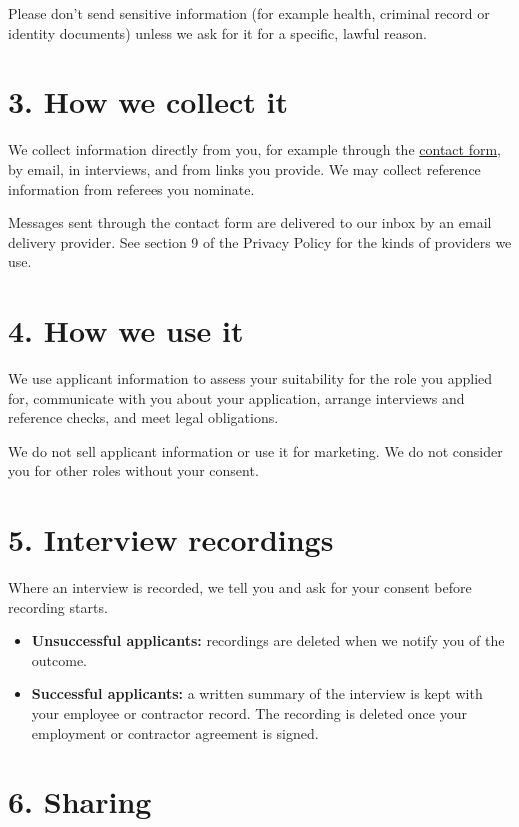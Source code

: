 \documentclass[11pt]{article}
\providecommand{\tightlist}{\setlength{\itemsep}{0pt}\setlength{\parskip}{0pt}}
\begin{document}
Please don't send sensitive information (for example health, criminal record or identity documents) unless we ask for it for a specific, lawful reason.

\section*{3. How we collect it}

We collect information directly from you, for example through the \href{https://repasscloud.com/contact/}{contact form}, by email, in interviews, and from links you provide. We may collect reference information from referees you nominate.

Messages sent through the contact form are delivered to our inbox by an email delivery provider. See section 9 of the Privacy Policy for the kinds of providers we use.

\section*{4. How we use it}

We use applicant information to assess your suitability for the role you applied for, communicate with you about your application, arrange interviews and reference checks, and meet legal obligations.

We do not sell applicant information or use it for marketing. We do not consider you for other roles without your consent.

\section*{5. Interview recordings}

Where an interview is recorded, we tell you and ask for your consent before recording starts.

\begin{itemize}
\tightlist
\item
  \textbf{Unsuccessful applicants:} recordings are deleted when we notify you of the outcome.
\item
  \textbf{Successful applicants:} a written summary of the interview is kept with your employee or contractor record. The recording is deleted once your employment or contractor agreement is signed.
\end{itemize}

\section*{6. Sharing}
\end{document}
